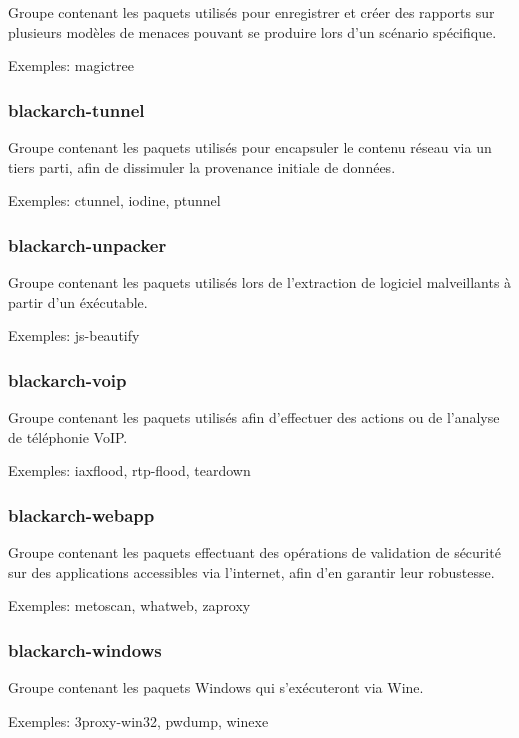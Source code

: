 \documentclass[a4paper, oneside, 11pt]{book}
\begin{document}
Groupe contenant les paquets utilisés pour enregistrer et créer des rapports sur
plusieurs modèles de menaces pouvant se produire lors d'un scénario spécifique.

Exemples: magictree

\subsubsection{blackarch-tunnel}

Groupe contenant les paquets utilisés pour encapsuler le contenu réseau via un
tiers parti, afin de dissimuler la provenance initiale de données.

Exemples: ctunnel, iodine, ptunnel

\subsubsection{blackarch-unpacker}

Groupe contenant les paquets utilisés lors de l'extraction de logiciel
malveillants à partir d'un éxécutable.

Exemples: js-beautify

\subsubsection{blackarch-voip}

Groupe contenant les paquets utilisés afin d'effectuer des actions ou de l'analyse
de téléphonie VoIP.

Exemples: iaxflood, rtp-flood, teardown

\subsubsection{blackarch-webapp}

Groupe contenant les paquets effectuant des opérations de validation de sécurité
sur des applications accessibles via l'internet, afin d'en garantir leur
robustesse.

Exemples: metoscan, whatweb, zaproxy

\subsubsection{blackarch-windows}

Groupe contenant les paquets Windows qui s'exécuteront via Wine.

Exemples: 3proxy-win32, pwdump, winexe
\end{document}
